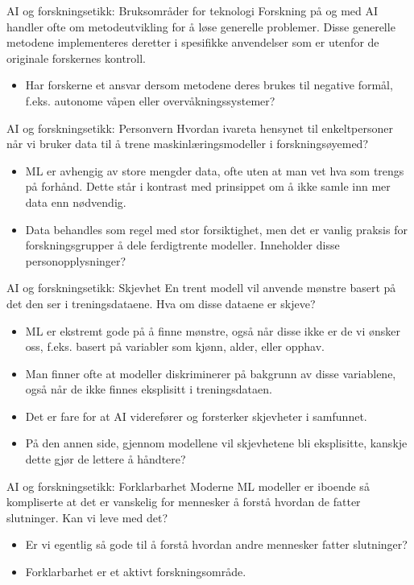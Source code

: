 \documentclass[8pt]{beamer}
\begin{document}
	\begin{frame}{AI og forskningsetikk: Bruksområder for teknologi}
		Forskning på og med AI handler ofte om metodeutvikling for å løse generelle problemer. Disse generelle metodene implementeres deretter i spesifikke anvendelser som er utenfor de originale forskernes kontroll.
		\begin{itemize}
			\item Har forskerne et ansvar dersom metodene deres brukes til negative formål, f.eks. autonome våpen eller overvåkningssystemer?
		\end{itemize}
	\end{frame}

	\begin{frame}{AI og forskningsetikk: Personvern}
		Hvordan ivareta hensynet til enkeltpersoner når vi bruker data til å trene maskinlæringsmodeller i forskningsøyemed?
		\begin{itemize}
			\item ML er avhengig av store mengder data, ofte uten at man vet hva som trengs på forhånd. Dette står i kontrast med prinsippet om å ikke samle inn mer data enn nødvendig.
			\item Data behandles som regel med stor forsiktighet, men det er vanlig praksis for forskningsgrupper å dele ferdigtrente modeller. Inneholder disse personopplysninger?
		\end{itemize}
	\end{frame}

	\begin{frame}{AI og forskningsetikk: Skjevhet}
		En trent modell vil anvende mønstre basert på det den ser i treningsdataene. Hva om disse dataene er skjeve?
		\begin{itemize}
			\item ML er ekstremt gode på å finne mønstre, også når disse ikke er de vi ønsker oss, f.eks. basert på variabler som kjønn, alder, eller opphav.
			\item Man finner ofte at modeller diskriminerer på bakgrunn av disse variablene, også når de ikke finnes eksplisitt i treningsdataen.
			\item Det er fare for at AI viderefører og forsterker skjevheter i samfunnet.
			\item På den annen side, gjennom modellene vil skjevhetene bli eksplisitte, kanskje dette gjør de lettere å håndtere?
		\end{itemize}
	\end{frame}

	\begin{frame}{AI og forskningsetikk: Forklarbarhet}
		Moderne ML modeller er iboende så kompliserte at det er vanskelig for mennesker å forstå hvordan de fatter slutninger. Kan vi leve med det?
		\begin{itemize}
			\item Er vi egentlig så gode til å forstå hvordan andre mennesker fatter slutninger?
			\item Forklarbarhet er et aktivt forskningsområde.
		\end{itemize}
	\end{frame}
\end{document}
